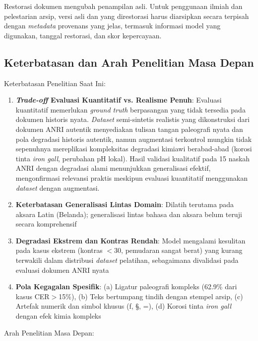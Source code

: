 \documentclass[journal]{IEEEtran}
\begin{document}
Restorasi dokumen mengubah penampilan asli. Untuk penggunaan ilmiah dan pelestarian arsip, versi asli dan yang direstorasi harus diarsipkan secara terpisah dengan \textit{metadata} provenans yang jelas, termasuk informasi model yang digunakan, tanggal restorasi, dan skor kepercayaan.

\subsection{Keterbatasan dan Arah Penelitian Masa Depan}

Keterbatasan Penelitian Saat Ini:
\begin{enumerate}
    \item \textbf{\textit{Trade-off} Evaluasi Kuantitatif vs. Realisme Penuh}: Evaluasi kuantitatif memerlukan \textit{ground truth} berpasangan yang tidak tersedia pada dokumen historis nyata. \textit{Dataset} semi-sintetis realistis yang dikonstruksi dari dokumen ANRI autentik menyediakan tulisan tangan paleografi nyata dan pola degradasi historis autentik, namun augmentasi terkontrol mungkin tidak sepenuhnya mereplikasi kompleksitas degradasi kimiawi berabad-abad (korosi tinta \textit{iron gall}, perubahan pH lokal). Hasil validasi kualitatif pada 15 naskah ANRI dengan degradasi alami menunjukkan generalisasi efektif, mengonfirmasi relevansi praktis meskipun evaluasi kuantitatif menggunakan \textit{dataset} dengan augmentasi.
    \item \textbf{Keterbatasan Generalisasi Lintas Domain}: Dilatih terutama pada aksara Latin (Belanda); generalisasi lintas bahasa dan aksara belum teruji secara komprehensif
    \item \textbf{Degradasi Ekstrem dan Kontras Rendah}: Model mengalami kesulitan pada kasus ekstrem (kontras $<$30, pemudaran sangat berat) yang kurang terwakili dalam distribusi \textit{dataset} pelatihan, sebagaimana divalidasi pada evaluasi dokumen ANRI nyata
    \item \textbf{Pola Kegagalan Spesifik}: (a) Ligatur paleografi kompleks (62.9\% dari kasus CER$>$15\%), (b) Teks bertumpang tindih dengan stempel arsip, (c) Artefak numerik dan simbol khusus (ƒ, §, =), (d) Korosi tinta \textit{iron gall} dengan efek kimia kompleks
\end{enumerate}

Arah Penelitian Masa Depan:
\end{document}
